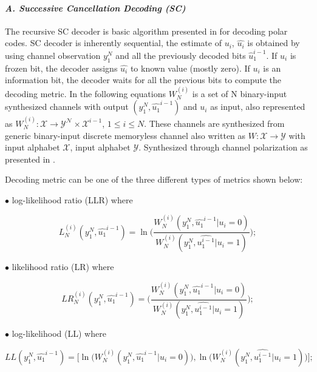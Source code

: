 \paragraph{\emph{A. Successive Cancellation Decoding (SC)}}  \label{SC}
The recursive SC decoder is basic algorithm presented in \cite{Arikan} for decoding polar codes.  SC decoder is inherently sequential, the estimate of $u_{i}$, $\hat{u_{i}}$ is obtained by using channel observation $y^{N}_{1}$ and all the previously decoded bits $\hat{u}_{1}^{i-1}$. If $u_{i}$ is frozen bit, the decoder assigns $\hat{u_{i}}$ to known value (mostly zero). If $u_{i}$ is an information bit, the decoder waits for all the previous bits to compute the decoding metric.  In the following equations $W_{N}^{(i)}$ is a set of N binary-input synthesized channels with output $(y_{1}^{N},\hat{u_{1}}^{i-1})$ and $ u_{i} $ as input, also represented as $W_{N}^{(i)}:\mathcal{X}\to \mathcal{Y^N} \times \mathcal{X}^{i-1}$, $1 \leq i \leq N$. These channels are synthesized from generic binary-input discrete memoryless channel also written as $W:\mathcal{X}\to \mathcal{Y}$ with input alphabet $\mathcal{X}$, input alphabet $\mathcal{Y}$. Synthesized through channel polarization as presented in \cite{Arikan}.  \newline

Decoding metric can be one of the three different types of metrics shown below:

$\bullet$ log-likelihood ratio (LLR) where

\begin{equation}
L_{N}^{(i)}(y_{1}^{N},\hat{u_{1}}^{i-1}) = \ln{\Bigg(\frac{W_{N}^{(i)}(y_{1}^{N},\hat{u_{1}}^{i-1}|u_{i} = 0)} {W_{N}^{(i)}(y_{1}^{N},\hat{u_{1}^{i-1}}|u_{i} = 1)}\Bigg)};
\end{equation}

$\bullet$ likelihood ratio (LR) where 

\begin{equation}
LR_{N}^{(i)}(y_{1}^{N},\hat{u_{1}}^{i-1}) = \Bigg(\frac{W_{N}^{(i)}(y_{1}^{N},\hat{u_{1}}^{i-1}|u_{i} = 0)} {W_{N}^{(i)}(y_{1}^{N},\hat{u_{1}^{i-1}}|u_{i} = 1)}\Bigg);
\end{equation}

$\bullet$ log-likelihood (LL) where 

\begin{equation}
LL(y_{1}^{N},\hat{u_{1}}^{i-1}) = \Big[\ln\Big(W_{N}^{(i)}(y_{1}^{N},\hat{u_{1}}^{i-1}|u_{i} = 0)\Big), \ln\Big(W_{N}^{(i)}(y_{1}^{N},\hat{u_{1}^{i-1}}|u_{i} = 1)\Big)\Big];
\end{equation}

